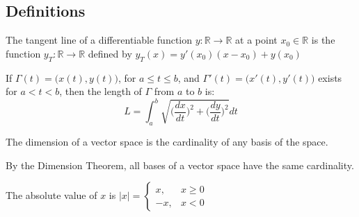\documentclass[crop=false,class=book,oneside]{standalone}
\begin{document}
    \subsection{Definitions}
        \begin{definition*}
                The tangent line of a differentiable function
                $y:\mathbb{R}\rightarrow\mathbb{R}$ at a point
                $x_{0}\in\mathbb{R}$ is the function
                $y_{T}:\mathbb{R}\rightarrow\mathbb{R}$ defined by
                $y_{T}(x)=y'(x_0)(x-x_0)+y(x_0)$ 
            \end{definition*}
        \begin{definition*}
            If $\Gamma(t)=\big(x(t),y(t)\big)$, for $a\leq t\leq b$,
            and $\Gamma'(t)=\big(x'(t),y'(t)\big)$ exists for
            $a<t<b$, then the length of $\Gamma$ from $a$ to $b$ is:
            \begin{equation}
                L=\int_{a}^{b}\sqrt{
                    \bigg(\frac{dx}{dt}\bigg)^{2}+
                    \bigg(\frac{dy}{dt}\bigg)^{2}
                }dt
            \end{equation}
        \end{definition*}
        \begin{definition*}
            The dimension of a vector space is the cardinality of
            any basis of the space. 
        \end{definition*}
        \begin{remark*}
            By the Dimension Theorem, all bases of a vector space
            have the same cardinality.
        \end{remark*}
        \begin{definition*}
            The absolute value of $x$ is
            $|x|=\begin{cases}%
                x,&x\geq 0\\ 
                -x,&x<0
            \end{cases}$
        \end{definition*}
\end{document}
